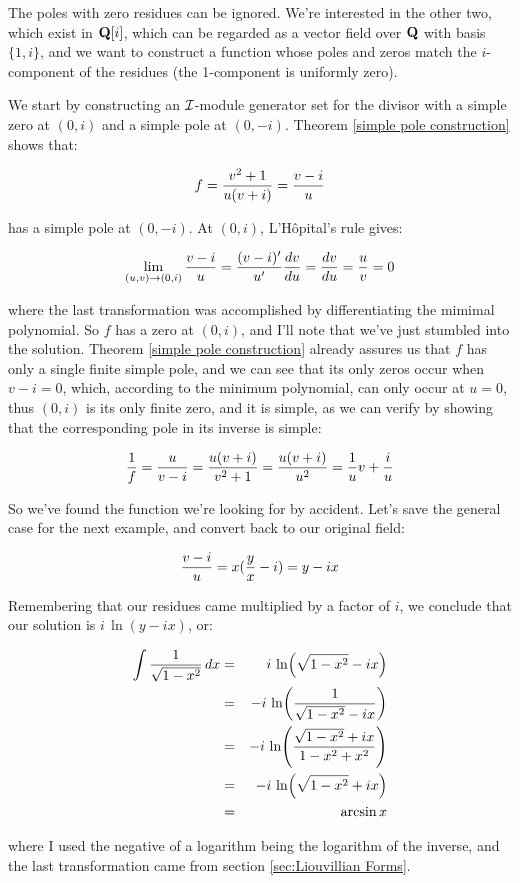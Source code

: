 The poles with zero residues can be ignored.  We're interested in the
other two, which exist in ${\bf Q}[i]$, which can be regarded as a
vector field over ${\bf Q}$ with basis $\{1, i\}$, and we want to
construct a function whose poles and zeros match the $i$-component of
the residues (the 1-component is uniformly zero).

We start by constructing an ${\cal I}$-module generator set for the divisor
with a simple zero at $(0,i)$ and a simple pole at $(0,-i)$.  Theorem
\ref{simple pole construction} shows that:

$$f = {{v^2+1}\over{u(v+i)}} = {{v-i}\over{u}} $$

has a simple pole at $(0,-i)$.  At $(0,i)$, L'H\^opital's rule gives:

$$ \lim_{(u,v)\to (0,i)} {{v-i}\over{u}}
   = {{(v-i)'}\over{u'}} {{dv}\over{du}} = {{dv}\over{du}} = {u\over v} = 0 $$

where the last transformation was accomplished by differentiating the
mimimal polynomial.  So $f$ has a zero at $(0,i)$, and I'll note that
we've just stumbled into the solution.  Theorem \ref{simple pole
construction} already assures us that $f$ has only a single finite
simple pole, and we can see that its only zeros occur when
$v-i=0$, which, according to the minimum polynomial, can only
occur at $u=0$, thus $(0,i)$ is its only finite zero, and it is
simple, as we can verify by showing that the corresponding pole in its
inverse is simple:

$$ {1\over f} = {u\over{v-i}} = {{u(v+i)}\over{v^2+1}}
  = {{u(v+i)}\over{u^2}} = {1\over u}v + {i\over u} $$


So we've found the function we're looking for by accident.  Let's save the
general case for the next example, and convert back to
our original field:

$${{v-i}\over{u}} = x({y\over x}-i) = y - ix $$

Remembering that our residues came multiplied by a factor of $i$, we
conclude that our solution is $i\,\ln(y-ix)$, or:

\begin{eqnarray*}
\int {1\over{\sqrt{1-x^2}}} \,dx &=& i\,\ln(\sqrt{1-x^2}-ix) \\
                                 &=& -i\,\ln({1\over{\sqrt{1-x^2}-ix}}) \\
                                 &=& -i\,\ln({{\sqrt{1-x^2}+ix}\over{1-x^2+x^2}}) \\
                                 &=& -i\,\ln({\sqrt{1-x^2}+ix}) \\
                                 &=& \arcsin x \\
\end{eqnarray*}

where I used the negative of a logarithm being the logarithm of the
inverse, and the last transformation came from section
\ref{sec:Liouvillian Forms}.


\endexample
